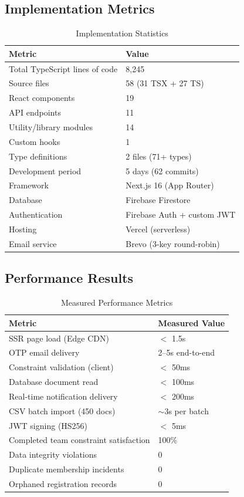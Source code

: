 \documentclass[conference]{IEEEtran}
\begin{document}
\subsection{Implementation Metrics}

\begin{table}[htbp]
\centering
\caption{Implementation Statistics}
\label{tab:metrics}
\footnotesize
\renewcommand{\arraystretch}{1.15}
\begin{tabular}{@{}ll@{}}
\toprule
\textbf{Metric} & \textbf{Value} \\
\midrule
Total TypeScript lines of code & 8,245 \\
Source files & 58 (31 TSX + 27 TS) \\
React components & 19 \\
API endpoints & 11 \\
Utility/library modules & 14 \\
Custom hooks & 1 \\
Type definitions & 2 files (71+ types) \\
Development period & 5 days (62 commits) \\
Framework & Next.js 16 (App Router) \\
Database & Firebase Firestore \\
Authentication & Firebase Auth + custom JWT \\
Hosting & Vercel (serverless) \\
Email service & Brevo (3-key round-robin) \\
\bottomrule
\end{tabular}
\end{table}

\subsection{Performance Results}

\begin{table}[htbp]
\centering
\caption{Measured Performance Metrics}
\label{tab:performance}
\footnotesize
\renewcommand{\arraystretch}{1.15}
\begin{tabular}{@{}ll@{}}
\toprule
\textbf{Metric} & \textbf{Measured Value} \\
\midrule
SSR page load (Edge CDN) & $<$ 1.5s \\
OTP email delivery & 2--5s end-to-end \\
Constraint validation (client) & $<$ 50ms \\
Database document read & $<$ 100ms \\
Real-time notification delivery & $<$ 200ms \\
CSV batch import (450 docs) & $\sim$3s per batch \\
JWT signing (HS256) & $<$ 5ms \\
Completed team constraint satisfaction & 100\% \\
Data integrity violations & 0 \\
Duplicate membership incidents & 0 \\
Orphaned registration records & 0 \\
\bottomrule
\end{tabular}
\end{table}
\end{document}
